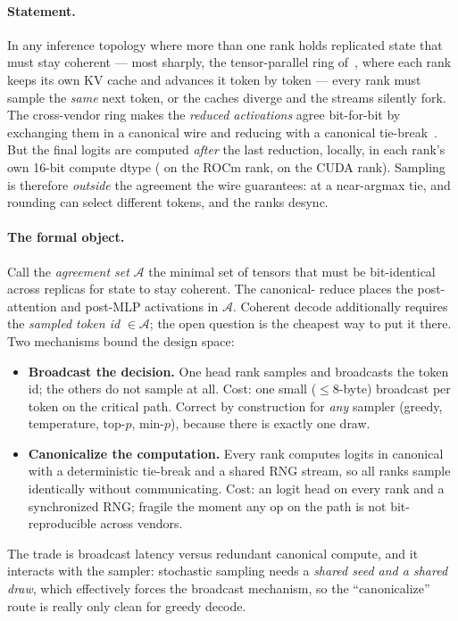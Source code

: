 \documentclass[11pt]{article}
\begin{document}
\paragraph{Statement.} In any inference topology where more than one rank holds replicated state that must
stay coherent --- most sharply, the tensor-parallel ring of~\cite{het}, where each rank keeps its own KV
cache and advances it token by token --- every rank must sample the \emph{same} next token, or the caches
diverge and the streams silently fork. The cross-vendor ring makes the \emph{reduced activations} agree
bit-for-bit by exchanging them in a canonical  wire and reducing with a canonical
tie-break~\cite{het}. But the final logits are computed \emph{after} the last reduction, locally, in each
rank's own 16-bit compute dtype ( on the ROCm rank,  on the CUDA rank). Sampling is
therefore \emph{outside} the agreement the wire guarantees: at a near-argmax tie,  and
 rounding can select different tokens, and the ranks desync.

\paragraph{The formal object.} Call the \emph{agreement set} $\mathcal{A}$ the minimal set of tensors that
must be bit-identical across replicas for state to stay coherent. The canonical- reduce places
the post-attention and post-MLP activations in $\mathcal{A}$. Coherent decode additionally requires the
\emph{sampled token id} $\in\mathcal{A}$; the open question is the cheapest way to put it there. Two
mechanisms bound the design space:
\begin{itemize}[leftmargin=1.4em,itemsep=2pt]
\item \textbf{Broadcast the decision.} One head rank samples and broadcasts the token id; the others do not
sample at all. Cost: one small ($\le 8$-byte) broadcast per token on the critical path. Correct by
construction for \emph{any} sampler (greedy, temperature, top-$p$, min-$p$), because there is exactly one
draw.
\item \textbf{Canonicalize the computation.} Every rank computes logits in canonical  with a
deterministic tie-break and a shared RNG stream, so all ranks sample identically without communicating.
Cost: an  logit head on every rank and a synchronized RNG; fragile the moment any op on the path
is not bit-reproducible across vendors.
\end{itemize}
The trade is broadcast latency versus redundant canonical compute, and it interacts with the sampler:
stochastic sampling needs a \emph{shared seed and a shared draw}, which effectively forces the broadcast
mechanism, so the ``canonicalize'' route is really only clean for greedy decode.
\end{document}
